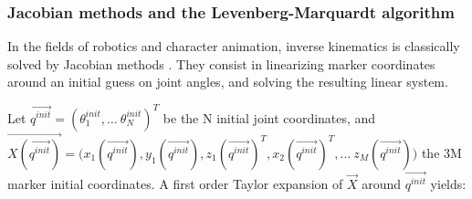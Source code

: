 \newpage
\subsubsection{Jacobian methods and the Levenberg-Marquardt algorithm}\label{levenberg}

In the fields of robotics and character animation, inverse kinematics is classically solved by Jacobian methods \cite{Siciliano1990,Buss2009,Aristidou2018}. They consist in linearizing marker coordinates around an initial guess on joint angles, and solving the resulting linear system. %

Let $\overrightarrow{q^{init}}=(\theta_1^{init}, \dots \  \theta_N^{init})^T$ be the N initial joint coordinates, and \\
$\overrightarrow{X(\overrightarrow{q^{init}})} = \bigl(x_1(\overrightarrow{q^{init}}), y_1(\overrightarrow{q^{init}}), z_1(\overrightarrow{q^{init}})^T, x_2(\overrightarrow{q^{init}})^T, \dots \ z_M(\overrightarrow{q^{init}})\bigr)$ the 3M marker initial coordinates. A first order Taylor expansion of $\overrightarrow{X}$ around $\overrightarrow{q^{init}}$ yields:
